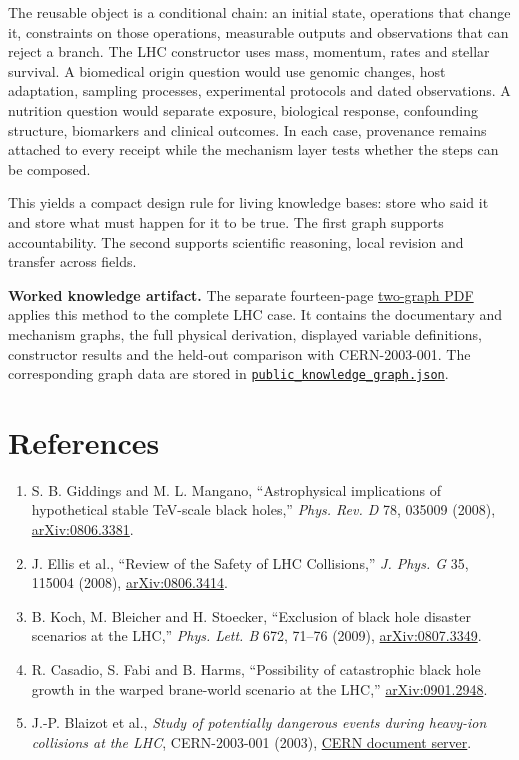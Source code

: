 \documentclass[10pt]{article}
\newcommand{\sourcefile}[2]{\href{https://github.com/synthetix-institute/lhc-mechanism-audit/blob/main/#1}{\texttt{#2}}}
\newcommand{\judgebox}[1]{%
  \par\smallskip\noindent\begingroup\setlength{\fboxsep}{8pt}%
  \colorbox{bluebg}{\parbox{\dimexpr\linewidth-2\fboxsep\relax}{\color{ink}#1}}%
  \endgroup\par\smallskip}
\begin{document}
The reusable object is a conditional chain: an initial state, operations that change it, constraints on those operations, measurable outputs and observations that can reject a branch. The LHC constructor uses mass, momentum, rates and stellar survival. A biomedical origin question would use genomic changes, host adaptation, sampling processes, experimental protocols and dated observations. A nutrition question would separate exposure, biological response, confounding structure, biomarkers and clinical outcomes. In each case, provenance remains attached to every receipt while the mechanism layer tests whether the steps can be composed.

This yields a compact design rule for living knowledge bases: store who said it and store what must happen for it to be true. The first graph supports accountability. The second supports scientific reasoning, local revision and transfer across fields.

\judgebox{\textbf{Worked knowledge artifact.} The separate fourteen-page \href{https://github.com/synthetix-institute/lhc-mechanism-audit/blob/main/paper/lhc_black_hole_answer.pdf}{two-graph PDF} applies this method to the complete LHC case. It contains the documentary and mechanism graphs, the full physical derivation, displayed variable definitions, constructor results and the held-out comparison with CERN-2003-001. The corresponding graph data are stored in \sourcefile{runs/lhc_black_hole_audit_revised/public_knowledge_graph.json}{public\_knowledge\_graph.json}.}

\section*{References}
\footnotesize
\begin{enumerate}[leftmargin=*,itemsep=0pt,topsep=0pt]
\item S. B. Giddings and M. L. Mangano, ``Astrophysical implications of hypothetical stable TeV-scale black holes,'' \emph{Phys. Rev. D} 78, 035009 (2008), \href{https://arxiv.org/abs/0806.3381}{arXiv:0806.3381}.
\item J. Ellis et al., ``Review of the Safety of LHC Collisions,'' \emph{J. Phys. G} 35, 115004 (2008), \href{https://arxiv.org/abs/0806.3414}{arXiv:0806.3414}.
\item B. Koch, M. Bleicher and H. Stoecker, ``Exclusion of black hole disaster scenarios at the LHC,'' \emph{Phys. Lett. B} 672, 71--76 (2009), \href{https://arxiv.org/abs/0807.3349}{arXiv:0807.3349}.
\item R. Casadio, S. Fabi and B. Harms, ``Possibility of catastrophic black hole growth in the warped brane-world scenario at the LHC,'' \href{https://arxiv.org/abs/0901.2948}{arXiv:0901.2948}.
\item J.-P. Blaizot et al., \emph{Study of potentially dangerous events during heavy-ion collisions at the LHC}, CERN-2003-001 (2003), \href{https://cds.cern.ch/record/613175/files/CERN-2003-001.pdf}{CERN document server}.
\end{enumerate}
\end{document}

